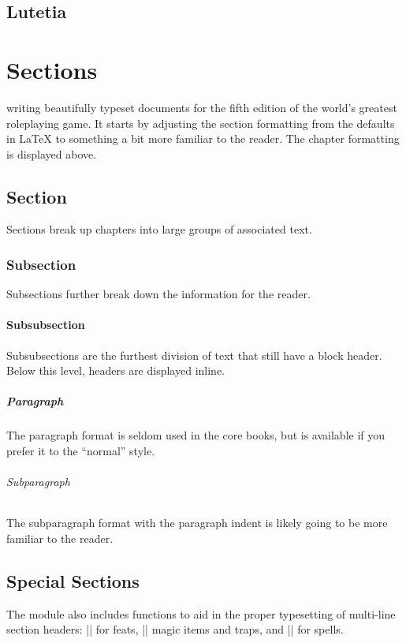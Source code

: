 \documentclass[letterpaper,twocolumn,openany,nodeprecatedcode]{dndbook}
\begin{document}
\section{Lutetia}

\chapter{Sections}

 writing beautifully typeset documents for the fifth edition of the world's greatest roleplaying game. It starts by adjusting the section formatting from the defaults in \LaTeX{} to something a bit more familiar to the reader. The chapter formatting is displayed above.

\section{Section}
Sections break up chapters into large groups of associated text.

\subsection{Subsection}
Subsections further break down the information for the reader.

\subsubsection{Subsubsection}
Subsubsections are the furthest division of text that still have a block header. Below this level, headers are displayed inline.

\paragraph{Paragraph}
The paragraph format is seldom used in the core books, but is available if you prefer it to the ``normal'' style.

\subparagraph{Subparagraph}
The subparagraph format with the paragraph indent is likely going to be more familiar to the reader.

\section{Special Sections}
The module also includes functions to aid in the proper typesetting of multi-line section headers: |\DndFeatHeader| for feats, |\DndItemHeader| magic items and traps, and |\DndSpellHeader| for spells.
\end{document}

